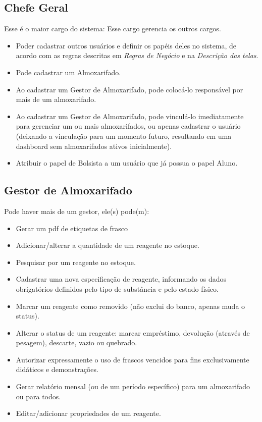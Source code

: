 \documentclass[12pt,a4paper]{article}
\begin{document}
\subsection{Chefe Geral}
Esse é o maior cargo do sistema: Esse cargo gerencia os outros cargos.
\begin{itemize}
    \item Poder cadastrar outros usuários e definir os papéis deles no sistema, de acordo com as regras descritas em \textit{Regras de Negócio} e na \textit{Descrição das telas}.
    \item Pode cadastrar um Almoxarifado. 
    \item Ao cadastrar um Gestor de Almoxarifado, pode colocá-lo responsável por mais de um almoxarifado. 
    \item Ao cadastrar um Gestor de Almoxarifado, pode vinculá-lo imediatamente para gerenciar um ou mais almoxarifados, ou apenas cadastrar o usuário (deixando a vinculação para um momento futuro, resultando em uma dashboard sem almoxarifados ativos inicialmente).
    \item Atribuir o papel de Bolsista a um usuário que já possua o papel Aluno.
\end{itemize}

\subsection{Gestor de Almoxarifado}
Pode haver mais de um gestor, ele(s) pode(m):
\begin{itemize}
    \item Gerar um pdf de etiquetas de frasco 
    \item Adicionar/alterar a quantidade de um reagente no estoque.
    \item Pesquisar por um reagente no estoque.
    \item Cadastrar uma nova especificação de reagente, informando os dados obrigatórios definidos pelo tipo de substância e pelo estado físico.
    \item Marcar um reagente como removido (não exclui do banco, apenas muda o status).
    \item Alterar o status de um reagente: marcar empréstimo, devolução (através de pesagem), descarte, vazio ou quebrado.
    \item Autorizar expressamente o uso de frascos vencidos para fins exclusivamente didáticos e demonstrações.
    \item Gerar relatório mensal (ou de um período específico) para um almoxarifado ou para todos.
    \item Editar/adicionar propriedades de um reagente.
\end{itemize}
\end{document}
